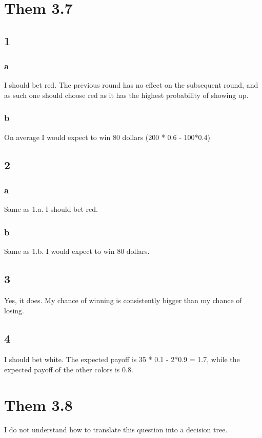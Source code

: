 \documentclass[11pt]{article}
\begin{document}
\section*{Them 3.7}
\label{sec:orgf63a2bf}

\subsection*{1}
\label{sec:orge852ef2}
\subsubsection*{a}
\label{sec:orgcb9ac27}
I should bet red. The previous round has no effect on the subsequent round, and as such one should choose red as it has the highest probability of showing up.
\subsubsection*{b}
\label{sec:orgf8511ed}
On average I would expect to win 80 dollars (200 * 0.6 - 100*0.4)
\subsection*{2}
\label{sec:org735016c}
\subsubsection*{a}
\label{sec:orgbd16961}
Same as 1.a. I should bet red.
\subsubsection*{b}
\label{sec:org402d054}
Same as 1.b. I would expect to win 80 dollars.
\subsection*{3}
\label{sec:org2d57e29}
Yes, it does. My chance of winning is consistently bigger than my chance of losing.

\subsection*{4}
\label{sec:org59d378c}
I should bet white. The expected payoff is 35 * 0.1 - 2*0.9 = 1.7, while the expected payoff of the other colors is 0.8.

\section*{Them 3.8}
\label{sec:org2caaa2e}
I do not understand how to translate this question into a decision tree.
\end{document}
